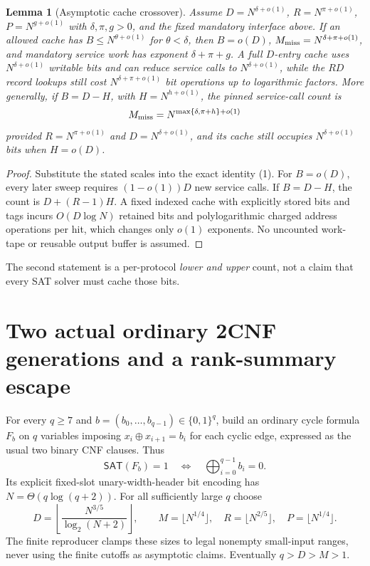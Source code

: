 \documentclass[11pt]{article}
\newtheorem{lemma}[theorem]{Lemma}
\newcommand{\SAT}{\mathsf{SAT}}
\begin{document}
\begin{lemma}[Asymptotic cache crossover]\label{lem:cross}
Assume $D=N^{\delta+o(1)}$, $R=N^{\pi+o(1)}$,
$P=N^{g+o(1)}$ with $\delta,\pi,g>0$, and the fixed mandatory
interface above. If an allowed cache has
$B\le N^{\theta+o(1)}$ for $\theta<\delta$, then
$B=o(D)$, $M_{\rm miss}=N^{\delta+\pi+o(1)}$, and
mandatory service work has exponent $\delta+\pi+g$.
A full $D$-entry cache uses $N^{\delta+o(1)}$ writable bits
and can reduce service calls to $N^{\delta+o(1)}$, while the
$RD$ record lookups still cost $N^{\delta+\pi+o(1)}$
bit operations up to logarithmic factors. More generally, if
$B=D-H$, with $H=N^{h+o(1)}$, the pinned service-call
count is
\[
M_{\rm miss}=
N^{\max\{\delta,\pi+h\}+o(1)}
\]
provided $R=N^{\pi+o(1)}$ and $D=N^{\delta+o(1)}$,
and its cache still occupies $N^{\delta+o(1)}$ bits when $H=o(D)$.
\end{lemma}
\begin{proof}
Substitute the stated scales into the exact identity (1).
For $B=o(D)$, every later sweep requires $(1-o(1))D$ new
service calls. If $B=D-H$, the count is $D+(R-1)H$.
A fixed indexed cache with explicitly stored bits and tags incurs
$O(D\log N)$ retained bits and polylogarithmic charged
address operations per hit, which changes only $o(1)$ exponents.
No uncounted work-tape or reusable output buffer is assumed.
\end{proof}

The second statement is a per-protocol \emph{lower and upper}
count, not a claim that every SAT solver must cache those bits.

\section{Two actual ordinary 2CNF generations and a rank-summary escape}
For every $q\ge7$ and $b=(b_0,\ldots,b_{q-1})\in\{0,1\}^q$,
build an ordinary cycle formula $F_b$ on $q$ variables imposing
$x_i\oplus x_{i+1}=b_i$ for each cyclic edge, expressed as the
usual two binary CNF clauses. Thus
\[
\boxed{\SAT(F_b)=1\quad\Longleftrightarrow\quad
\bigoplus_{i=0}^{q-1}b_i=0.}\tag{2}
\]
Its explicit fixed-slot unary-width-header bit encoding has
$N=\Theta(q\log(q+2))$. For all sufficiently large $q$ choose
\[
D=\left\lfloor\frac{N^{3/5}}{\log_2(N+2)}\right\rfloor,
\qquad M=\lfloor N^{1/4}\rfloor,\quad
R=\lfloor N^{2/5}\rfloor,\quad P=\lfloor N^{1/4}\rfloor.
\]
The finite reproducer clamps these sizes to legal nonempty
small-input ranges, never using the finite cutoffs as asymptotic
claims. Eventually $q>D>M>1$.
\end{document}

